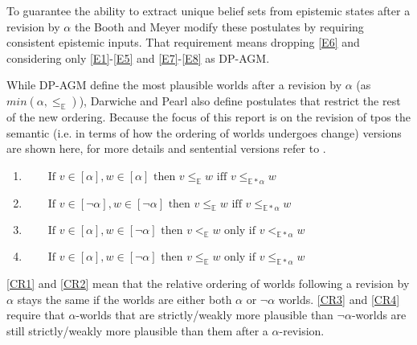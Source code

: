 \documentclass[11pt]{scrartcl}
\theoremstyle{definition}
\theoremstyle{definition}
\begin{document}
To guarantee the ability to extract unique belief sets from epistemic states after a revision by $\alpha$ the Booth and Meyer \cite{Booth2011} modify these postulates by requiring consistent epistemic inputs. That requirement means dropping \ref{E6} and considering only \ref{E1}-\ref{E5} and \ref{E7}-\ref{E8} as DP-AGM.

While DP-AGM define the most plausible worlds after a revision by $\alpha$ (as $min(\alpha, \leq_{\mathbb{E}})$), Darwiche and Pearl also define postulates that restrict the rest of the new ordering. Because the focus of this report is on the revision of tpos the semantic (i.e. in terms of how the ordering of worlds undergoes change) versions are shown here, for more details and sentential versions refer to \cite{Darwiche1997}.

\begin{enumerate}[wide=0pt, widest=99,leftmargin=\parindent,label = (CR$\arabic*$)]
    \item\label{CR1} $\qquad \textrm{If } v\in [\alpha], w \in [\alpha] \textrm{ then } v \leq_{\mathbb{E}} w \textrm{ iff } v \leq_{\mathbb{E\ast\alpha}} w$
    \item\label{CR2} $\qquad \textrm{If } v\in [\neg \alpha], w \in [\neg \alpha] \textrm{ then } v \leq_{\mathbb{E}} w \textrm{ iff } v \leq_{\mathbb{E\ast\alpha}} w$
    \item\label{CR3} $\qquad \textrm{If } v\in [ \alpha], w \in [\neg \alpha] \textrm{ then } v <_{\mathbb{E}} w \textrm{ only if } v <_{\mathbb{E\ast\alpha}} w$
    \item\label{CR4} $\qquad \textrm{If } v\in [ \alpha], w \in [\neg \alpha] \textrm{ then } v \leq_{\mathbb{E}} w \textrm{ only if } v \leq_{\mathbb{E\ast\alpha}} w$
\end{enumerate}

\ref{CR1} and \ref{CR2} mean that the relative ordering of worlds following a revision by $\alpha$ stays the same if the worlds are either both $\alpha$ or $\neg\alpha$ worlds. \ref{CR3} and \ref{CR4} require that $\alpha$-worlds that are strictly/weakly more plausible than $\neg\alpha$-worlds are still strictly/weakly more plausible than them after a $\alpha$-revision.

\end{document}
